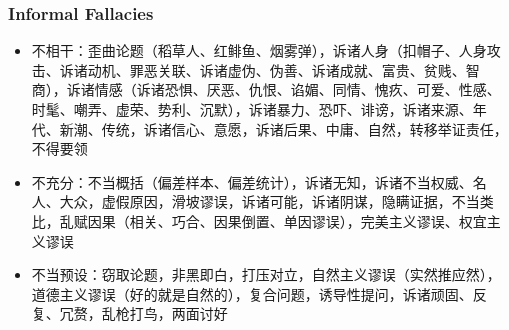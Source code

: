 \documentclass[UTF8,aspectratio=43,11pt,colorlinks,compress,openany]{beamer}%
\begin{document}
\begin{frame}\frametitle{Informal Fallacies}
\begin{itemize}
	\item 不相干：歪曲论题（稻草人、红鲱鱼、烟雾弹），诉诸人身（扣帽子、人身攻击、诉诸动机、罪恶关联、诉诸虚伪、伪善、诉诸成就、富贵、贫贱、智商），诉诸情感（诉诸恐惧、厌恶、仇恨、谄媚、同情、愧疚、可爱、性感、时髦、嘲弄、虚荣、势利、沉默），诉诸暴力、恐吓、诽谤，诉诸来源、年代、新潮、传统，诉诸信心、意愿，诉诸后果、中庸、自然，转移举证责任，不得要领
	\item 不充分：不当概括（偏差样本、偏差统计），诉诸无知，诉诸不当权威、名人、大众，虚假原因，滑坡谬误，诉诸可能，诉诸阴谋，隐瞒证据，不当类比，乱赋因果（相关、巧合、因果倒置、单因谬误），完美主义谬误、权宜主义谬误
	\item 不当预设：窃取论题，非黑即白，打压对立，自然主义谬误（实然推应然），道德主义谬误（好的就是自然的），复合问题，诱导性提问，诉诸顽固、反复、冗赘，乱枪打鸟，两面讨好
\end{itemize}
\end{frame}
\end{document}

